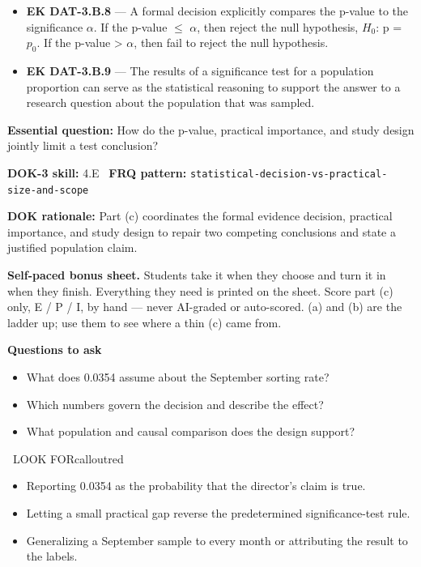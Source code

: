 \documentclass[11pt]{article}
\begin{document}
{\begin{itemize}[leftmargin=1.5em,itemsep=2pt,topsep=2pt]
  \item \textbf{EK DAT-3.B.8} --- A formal decision explicitly compares the p-value to the significance $\alpha$. If the p-value $\leq$ $\alpha$, then reject the null hypothesis, $H_0$: p = $p_0$. If the p-value > $\alpha$, then fail to reject the null hypothesis.
  \item \textbf{EK DAT-3.B.9} --- The results of a significance test for a population proportion can serve as the statistical reasoning to support the answer to a research question about the population that was sampled.
\end{itemize}
}
\textbf{Essential question:} How do the p-value, practical importance, and study design jointly limit a test conclusion?\par
\textbf{DOK-3 skill:} 4.E \textperiodcentered\ \textbf{FRQ pattern:} {\small\texttt{statistical-\allowbreak{}decision-\allowbreak{}vs-\allowbreak{}practical-\allowbreak{}size-\allowbreak{}and-\allowbreak{}scope}}\par
\textbf{DOK rationale:} Part (c) coordinates the formal evidence decision, practical importance, and study design to repair two competing conclusions and state a justified population claim.\par

\textbf{Self-paced bonus sheet.} Students take it when they choose and turn it in when they finish. Everything they need is printed on the sheet. Score part (c) only, E / P / I, by hand --- never AI-graded or auto-scored. (a) and (b) are the ladder up; use them to see where a thin (c) came from.\par

\textbf{Questions to ask}
\begin{itemize}[leftmargin=1.5em,itemsep=2pt,topsep=2pt]
  \item What does 0.0354 assume about the September sorting rate?
  \item Which numbers govern the decision and describe the effect?
  \item What population and causal comparison does the design support?
\end{itemize}

\begin{callout}{\IconWarn\ LOOK FOR}{calloutred}
\begin{itemize}[leftmargin=1.5em,itemsep=2pt,topsep=2pt]
  \item Reporting 0.0354 as the probability that the director's claim is true.
  \item Letting a small practical gap reverse the predetermined significance-test rule.
  \item Generalizing a September sample to every month or attributing the result to the labels.
\end{itemize}
\end{callout}
\end{document}
